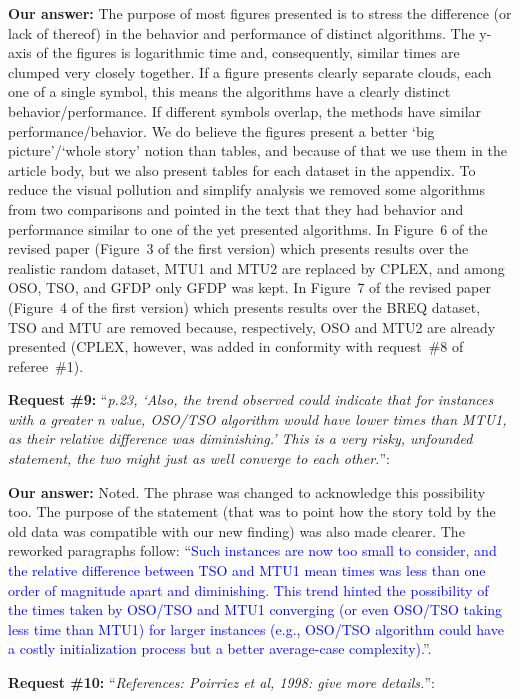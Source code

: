 \documentclass{elsarticle}
\begin{document}
\textbf{Our answer:} The purpose of most figures presented is to stress the difference (or lack of thereof) in the behavior and performance of distinct algorithms. The y-axis of the figures is logarithmic time and, consequently, similar times are clumped very closely together. If a figure presents clearly separate clouds, each one of a single symbol, this means the algorithms have a clearly distinct behavior/performance. If different symbols overlap, the methods have similar performance/behavior. We do believe the figures present a better `big picture'/`whole story' notion than tables, and because of that we use them in the article body, but we also present tables for each dataset in the appendix. To reduce the visual pollution and simplify analysis we removed some algorithms from two comparisons and pointed in the text that they had behavior and performance similar to one of the yet presented algorithms. In Figure~6 of the revised paper (Figure~3 of the first version) which presents results over the realistic random dataset, MTU1 and MTU2 are replaced by CPLEX, and among OSO, TSO, and GFDP only GFDP was kept. In Figure~7 of the revised paper (Figure~4 of the first version) which presents results over the BREQ dataset, TSO and MTU are removed because, respectively, OSO and MTU2 are already presented (CPLEX, however, was added in conformity with request~\#8 of referee~\#1).
\medskip

\textbf{Request \#9:} ``\textit{p.23, `Also, the trend observed could indicate that for instances with a greater n value, OSO/TSO algorithm would have lower times than MTU1, as their relative difference was diminishing.' This is a very risky, unfounded statement, the two might just as well converge to each other.}'':

\textbf{Our answer:} Noted. The phrase was changed to acknowledge this possibility too. The purpose of the statement (that was to point how the story told by the old data was compatible with our new finding) was also made clearer. The reworked paragraphs follow: ``\textcolor{blue}{Such instances are now too small to consider, and the relative difference between TSO and MTU1 mean times was less than one order of magnitude apart and diminishing. This trend hinted the possibility of the times taken by OSO/TSO and MTU1 converging (or even OSO/TSO taking less time than MTU1) for larger instances (e.g., OSO/TSO algorithm could have a costly initialization process but a better average-case complexity).}''.
\medskip

\textbf{Request \#10:} ``\textit{References: Poirriez et al, 1998: give more details.}'':
\end{document}
